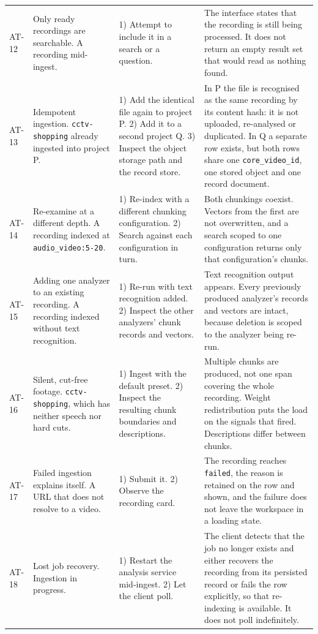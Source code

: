 \begin{table}[htbp]
\begin{tabularx}{\textwidth}{@{}L{0.9cm}L{3.2cm}XX@{}}
AT-12 & Only ready recordings are searchable. A recording mid-ingest. &
1) Attempt to include it in a search or a question. &
The interface states that the recording is still being processed. It does not return an
empty result set that would read as nothing found. \\

AT-13 & Idempotent ingestion. \texttt{cctv-shopping} already ingested into project P. &
1) Add the identical file again to project P. 2) Add it to a second project Q. 3)
Inspect the object storage path and the record store. &
In P the file is recognised as the same recording by its content hash: it is not
uploaded, re-analysed or duplicated. In Q a separate row exists, but both rows share one
\texttt{core\_video\_id}, one stored object and one record document. \\

AT-14 & Re-examine at a different depth. A recording indexed at
\texttt{audio\_video:5-20}. &
1) Re-index with a different chunking configuration. 2) Search against each
configuration in turn. &
Both chunkings coexist. Vectors from the first are not overwritten, and a search scoped
to one configuration returns only that configuration's chunks. \\

AT-15 & Adding one analyzer to an existing recording. A recording indexed without text
recognition. &
1) Re-run with text recognition added. 2) Inspect the other analyzers' chunk records and
vectors. &
Text recognition output appears. Every previously produced analyzer's records and
vectors are intact, because deletion is scoped to the analyzer being re-run. \\

AT-16 & Silent, cut-free footage. \texttt{cctv-shopping}, which has neither speech nor
hard cuts. &
1) Ingest with the default preset. 2) Inspect the resulting chunk boundaries and
descriptions. &
Multiple chunks are produced, not one span covering the whole recording. Weight
redistribution puts the load on the signals that fired. Descriptions differ between
chunks. \\

AT-17 & Failed ingestion explains itself. A URL that does not resolve to a video. &
1) Submit it. 2) Observe the recording card. &
The recording reaches \texttt{failed}, the reason is retained on the row and shown, and
the failure does not leave the workspace in a loading state. \\

AT-18 & Lost job recovery. Ingestion in progress. &
1) Restart the analysis service mid-ingest. 2) Let the client poll. &
The client detects that the job no longer exists and either recovers the recording from
its persisted record or fails the row explicitly, so that re-indexing is available.
It does not poll indefinitely. \\

\bottomrule
\end{tabularx}
\end{table}


